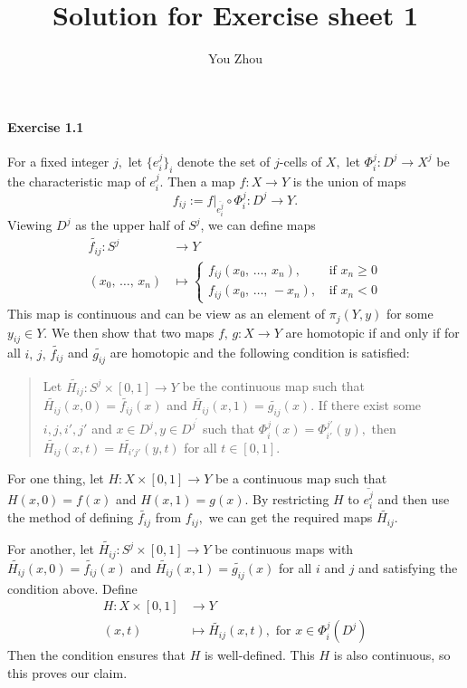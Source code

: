 \documentclass{article}
\title{Solution for Exercise sheet 1}
\author{You Zhou}
\date{}
\begin{document}
\maketitle
\paragraph{Exercise 1.1}For a fixed integer $j,$ let $\{e_i^j\}_i$ denote the set of $j$-cells of $X,$  let $\Phi_i^j\colon D^{j}\rightarrow X^{j}$ be the characteristic map of $e_i^j.$ Then a map $f\colon X\rightarrow Y$ is the union of maps
\[f_{ij}:=f|_{\overline{e_i^j}}\circ\Phi_i^j\colon D^j\rightarrow Y.\]
Viewing $D^j$ as the upper half of $S^j$, we can define maps
\begin{align*}
  \widetilde{f_{ij}}\colon S^{j} &\rightarrow Y \\
  (x_0,\,\ldots,\,x_n) &\mapsto \begin{cases}
   f_{ij}(x_0,\,\ldots,\,x_n),\,&\text{if } x_n\geq0\\
   f_{ij}(x_0,\,\ldots,\,-x_n),\,&\text{if }x_n<0
   \end{cases}
\end{align*}
This map is continuous and can be view as an element of $\pi_j(Y,y)$ for some $y_{ij}\in Y.$ We then show that two maps $f,\,g\colon X\rightarrow Y$ are homotopic if and only if for all $i,\,j,\,\widetilde{f_{ij}}$ and $\widetilde{g_{ij}}$ are homotopic and the following condition is satisfied:
\begin{quote}
  Let $\widetilde{H_{ij}}\colon S^j\times[0,1]\rightarrow Y$ be the continuous map such that $\widetilde{H_{ij}}(x,0)=\widetilde{f_{ij}}(x)$ and $\widetilde{H_{ij}}(x,1)=\widetilde{g_{ij}}(x).$ If there exist some $i,j,i',j'$ and $x\in D^j,y\in D^{j^{\prime}}$ such that $\Phi_i^j(x)=\Phi_{i'}^{j'}(y),$ then $\widetilde{H_{ij}}(x,t)=\widetilde{H_{i'j'}}(y,t)$ for all $t\in[0,1].$
\end{quote}

For one thing, let $H\colon X\times[0,1]\rightarrow Y$ be a continuous map such that $H(x,0)=f(x)$ and $H(x,1)=g(x).$ By restricting $H$ to $\overline{e_i^j}$ and then use the method of defining $\widetilde{f_{ij}}$ from $f_{ij},$ we can get the required maps $\widetilde{H_{ij}}.$

For another, let $\widetilde{H_{ij}}\colon S^j\times[0,1]\rightarrow Y$ be continuous maps with $\widetilde{H_{ij}}(x,0)=\widetilde{f_{ij}}(x)$ and $\widetilde{H_{ij}}(x,1)=\widetilde{g_{ij}}(x)$ for all $i$ and $j$ and satisfying the condition above. Define
\begin{align*}
  H\colon X\times[0,1] & \rightarrow Y \\
  (x,t) & \mapsto \widetilde{H_{ij}}(x,t),\text{ for }x\in\Phi_i^j(D^j)
\end{align*}
Then the condition ensures that $H$ is well-defined. This $H$ is also continuous, so this proves our claim.
\end{document}
